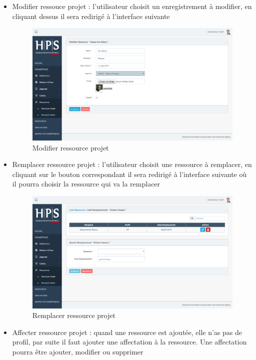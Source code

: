 \begin{itemize}[label=\textbullet]
\begin{itemize}
			\item Modifier ressouce projet : l'utilisateur choisit un enregistrement à modifier, en cliquant dessus il sera redirigé à l'interface suivante
			\begin{figure}[h!]  
			\centering
			\includegraphics[width=1\textwidth]{chapitre5/Figures/modressource.png}
			\caption{Modifier ressource projet}
			\end{figure}
			\item Remplacer ressource projet : l'utilisateur choisit une ressource à remplacer, en cliquant sur le bouton correspondant il sera redirigé à l'interface suivante où il pourra choisir la ressource qui va la remplacer
			\begin{figure}[h!]  
			\centering
			\includegraphics[width=1\textwidth]{chapitre5/Figures/rempressource.png}
			\caption{Remplacer ressource projet}
			\end{figure}
			\item Affecter ressource projet : quand une ressource est ajoutée, elle n'as pas de profil, par suite il faut ajouter une affectation à la ressource. Une affectation pourra être ajouter, modifier ou supprimer

\end{itemize}
\end{itemize}
